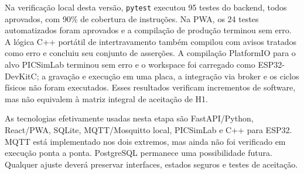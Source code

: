 Na verificação local desta versão, \texttt{pytest} executou 95 testes do backend,
todos aprovados, com 90\% de cobertura de instruções. Na PWA, os 24 testes
automatizados foram aprovados e a compilação de produção terminou sem erro. A
lógica C++ portátil de intertravamento também compilou com avisos tratados como
erro e concluiu seu conjunto de asserções. A compilação PlatformIO para o alvo
PICSimLab terminou sem erro e o workspace foi carregado como ESP32-DevKitC; a
gravação e execução em uma placa, a integração via broker e os ciclos físicos
não foram executados. Esses
resultados verificam incrementos de software, mas não equivalem à matriz integral
de aceitação de H1.


As tecnologias efetivamente usadas nesta etapa são FastAPI/Python, React/PWA,
SQLite, MQTT/Mosquitto local, PICSimLab e C++ para ESP32. MQTT está implementado
nos dois extremos, mas ainda não foi verificado em execução ponta a ponta.
PostgreSQL permanece uma possibilidade futura. Qualquer ajuste
deverá preservar interfaces, estados seguros e testes de aceitação.
